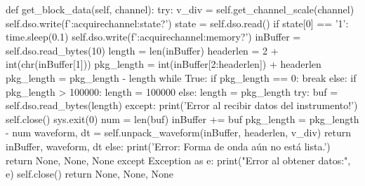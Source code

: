 \begin{python}
def get_block_data(self, channel):
    try:
        v_div = self.get_channel_scale(channel)
        self.dso.write(f':acquire{channel}:state?')
        state = self.dso.read()
        if state[0] == '1':
            time.sleep(0.1)
            self.dso.write(f':acquire{channel}:memory?')
            inBuffer = self.dso.read_bytes(10)
            length = len(inBuffer)
            headerlen = 2 + int(chr(inBuffer[1]))
            pkg_length = int(inBuffer[2:headerlen]) + headerlen
            pkg_length = pkg_length - length
            while True:
                if pkg_length == 0:
                    break
                else:
                    if pkg_length > 100000:
                        length = 100000
                    else:
                        length = pkg_length
                    try:
                        buf = self.dso.read_bytes(length)
                    except:
                        print('Error al recibir datos del instrumento!')
                        self.close()
                        sys.exit(0)
                    num = len(buf)
                    inBuffer += buf
                    pkg_length = pkg_length - num
            waveform, dt = self.unpack_waveform(inBuffer, headerlen, v_div)
            return inBuffer, waveform, dt
        else:
            print('Error: Forma de onda aún no está lista.')
            return None, None, None
    except Exception as e:
        print("Error al obtener datos:", e)
        self.close()
        return None, None, None
\end{python}

